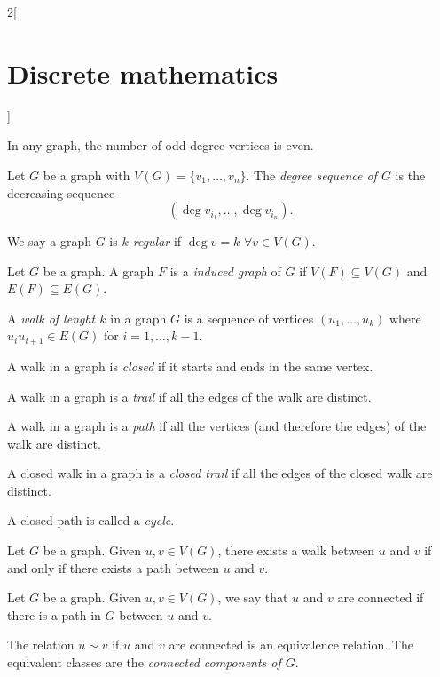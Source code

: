 \documentclass[class=article,10pt,crop=false]{standalone}
\begin{document}
\begin{multicols}{2}[\section{Discrete mathematics}]
\begin{corollary}
In any graph, the number of odd-degree vertices is even.
\end{corollary}
\begin{definition}
Let $G$ be a graph with $V(G)=\{v_1,\ldots,v_n\}$. The \textit{degree sequence of $G$} is the decreasing sequence $$(\deg v_{i_1},\ldots,\deg v_{i_n}).$$
\end{definition}
\begin{definition}
We say a graph $G$ is \textit{$k$-regular} if $\deg v=k$ $\forall v\in V(G)$.
\end{definition}
\begin{definition}
Let $G$ be a graph. A graph $F$ is a \textit{induced graph} of $G$ if $V(F)\subseteq V(G)$ and $E(F)\subseteq E(G)$.
\end{definition}
\begin{definition}
A \textit{walk of lenght $k$} in a graph $G$ is a sequence of vertices $(u_1,\ldots,u_k)$ where $u_iu_{i+1}\in E(G)$ for $i=1,\ldots,k-1$.
\end{definition}
\begin{definition}
A walk in a graph is \textit{closed} if it starts and ends in the same vertex.
\end{definition}
\begin{definition}
A walk in a graph is a \textit{trail} if all the edges of the walk are distinct.
\end{definition}
\begin{definition}
A walk in a graph is a \textit{path} if all the vertices (and therefore the edges) of the walk are distinct.
\end{definition}
\begin{definition}
A closed walk in a graph is a \textit{closed trail} if all the edges of the closed walk are distinct.
\end{definition}
\begin{definition}
A closed path is called a \textit{cycle}.
\end{definition}
\begin{prop}
Let $G$ be a graph. Given $u,v\in V(G)$, there exists a walk between $u$ and $v$ if and only if there exists a path between $u$ and $v$.
\end{prop}
\begin{definition}
Let $G$ be a graph. Given $u,v\in V(G)$, we say that $u$ and $v$ are connected if there is a path in $G$ between $u$ and $v$.
\end{definition}
\begin{prop}
The relation $u\sim v$ if $u$ and $v$ are connected is an equivalence relation. The equivalent classes are the \textit{connected components of $G$}.

\end{prop}
\end{multicols}
\end{document}
